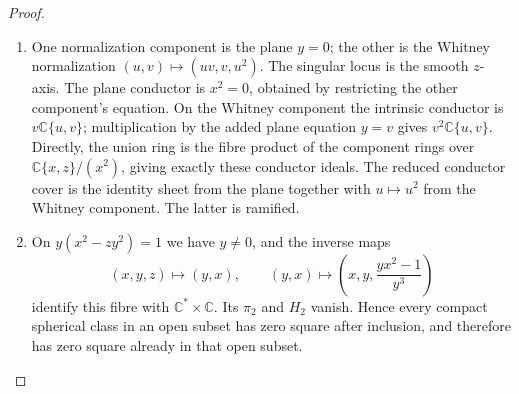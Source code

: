 \begin{proof}

\begin{enumerate}[label={$\langle1\rangle$\arabic*.},leftmargin=*]
\item One normalization component is the plane $y=0$; the other is
the Whitney normalization $(u,v)\mapsto(uv,v,u^2)$.
The singular locus is the smooth $z$-axis. The plane conductor
is $x^2=0$, obtained by restricting the other component's
equation. On the Whitney component the intrinsic conductor
is $v\mathbb C\{u,v\}$; multiplication by the added plane
equation $y=v$ gives $v^2\mathbb C\{u,v\}$. Directly, the
union ring is the fibre product of the component rings over
$\mathbb C\{x,z\}/(x^2)$, giving exactly these conductor ideals.
The reduced conductor cover is the identity sheet from the
plane together with $u\mapsto u^2$ from the Whitney component.
The latter is ramified.

\item On $y(x^2-zy^2)=1$ we have $y\ne0$, and the inverse maps
\[
 (x,y,z)\longmapsto(y,x),\qquad
 (y,x)\longmapsto\left(x,y,\frac{yx^2-1}{y^3}\right)
\]
identify this fibre with $\mathbb C^*\times\mathbb C$.
Its $\pi_2$ and $H_2$ vanish. Hence every compact spherical
class in an open subset has zero square after inclusion,
and therefore has zero square already in that open subset.

\end{enumerate}
\end{proof}

